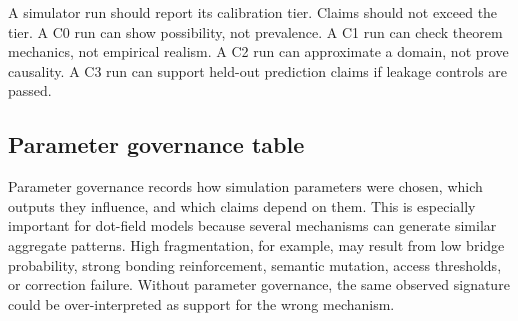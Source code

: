 \documentclass[11pt]{article}
\theoremstyle{remark}
\begin{document}
A simulator run should report its calibration tier. Claims should not exceed the tier. A C0 run can show possibility, not prevalence. A C1 run can check theorem mechanics, not empirical realism. A C2 run can approximate a domain, not prove causality. A C3 run can support held-out prediction claims if leakage controls are passed.

\subsection{Parameter governance table}\label{parameter-governance-table}

Parameter governance records how simulation parameters were chosen, which outputs they influence, and which claims depend on them. This is especially important for dot-field models because several mechanisms can generate similar aggregate patterns. High fragmentation, for example, may result from low bridge probability, strong bonding reinforcement, semantic mutation, access thresholds, or correction failure. Without parameter governance, the same observed signature could be over-interpreted as support for the wrong mechanism.
\end{document}
